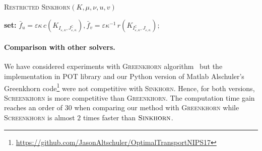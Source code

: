 {\LinesNotNumbered
\begin{algorithm}[tbp]
\DontPrintSemicolon
\caption{\textsc{Restricted \textsc{Sinkhorn}}$(K,\mu, \nu, u, v)$}
\label{restricted_sinkhorn}
\nl \textbf{set: } $\bar{f}_u = \varepsilon\kappa\, c(K_{I_{\varepsilon, \kappa}, J^\complement_{\varepsilon, \kappa}}), \bar{f}_v  = \varepsilon\kappa^{-1} \,r(K_{I^\complement_{\varepsilon, \kappa}, J_{\varepsilon, \kappa}});$\\
\nl {}
\nl {}
\end{algorithm}


\paragraph{Comparison with other solvers.}

We have considered experiments with \textsc{Greenkhorn} algorithm~\cite{altschulernips17} but the implementation in POT library and our Python version of Matlab Alschuler's Greenkhorn code\footnote{\url{https://github.com/JasonAltschuler/OptimalTransportNIPS17}} were not competitive with \textsc{Sinkhorn}. Hence, for both versions, \textsc{Screenkhorn} is more competitive than \textsc{Greenkhorn}. The computation time gain reaches an order of $30$ when comparing our method with \textsc{Greenkhorn} while \textsc{Screenkhorn} is almost $2$ times faster than $\textsc{Sinkhorn}$. 
}

